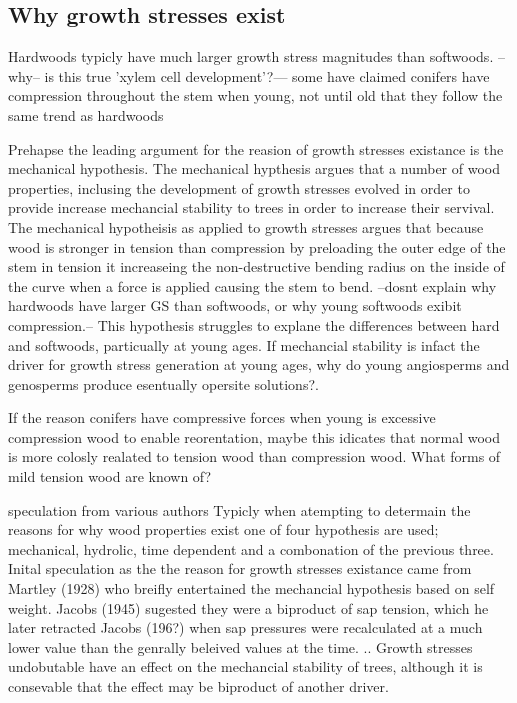 \documentclass{article}
\begin{document}
\subsection{Why growth stresses exist}
Hardwoods typicly have much larger growth stress magnitudes than softwoods.
--why-- is this true 'xylem cell development'?--- some have claimed conifers
have compression throughout the stem when young, not until old that they follow the same trend as
hardwoods

Prehapse the leading argument for the reasion of growth stresses existance is
the mechanical hypothesis. The mechanical hypthesis argues that a number of wood properties,
inclusing the development of growth stresses evolved in order to provide
increase mechancial stability to trees in order to increase their servival. The
mechanical hypotheisis as applied to growth stresses argues that because wood is
stronger in tension than compression by preloading the outer edge of the stem
in tension it increaseing the non-destructive bending radius on the inside of
the curve when a force is applied causing the stem to bend. --dosnt explain why
hardwoods have larger GS than softwoods, or why young softwoods exibit
compression.-- This hypothesis struggles to explane the differences between hard
and softwoods, particually at young ages. If mechancial stability is infact the
driver for growth stress generation at young ages, why do young angiosperms and
genosperms produce esentually opersite solutions?.

If the reason conifers have compressive forces when young is excessive
compression wood to enable reorentation, maybe this idicates that normal wood is
more colosly realated to tension wood than compression wood. What forms of mild
tension wood are known of?

speculation from various authors
Typicly when atempting to determain the reasons for why wood properties exist
one of four hypothesis are used; mechanical, hydrolic, time dependent and a
combonation of the previous three. Inital speculation as the the reason for
growth stresses existance came from Martley (1928) who breifly entertained the
mechancial hypothesis based on self weight. Jacobs (1945) sugested they were a
biproduct of sap tension, which he later retracted Jacobs (196?) when sap
pressures were recalculated at a much lower value than the genrally beleived
values at the time. .. Growth stresses undobutable have an effect on the
mechancial stability of trees, although it is consevable that the effect may be
biproduct of another driver.
\end{document}

